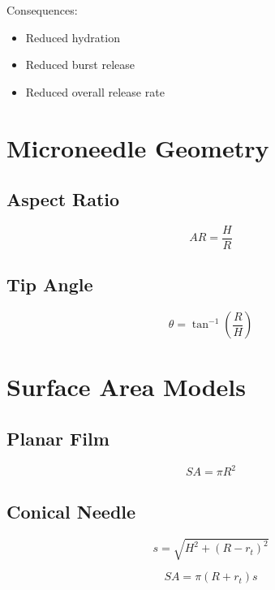 \documentclass[11pt]{article}
\begin{document}
Consequences:

\begin{itemize}
\item Reduced hydration
\item Reduced burst release
\item Reduced overall release rate
\end{itemize}

\section{Microneedle Geometry}

\subsection{Aspect Ratio}

\begin{equation}
AR=\frac{H}{R}
\end{equation}

\subsection{Tip Angle}

\begin{equation}
\theta=\tan^{-1}\left(\frac{R}{H}\right)
\end{equation}

\section{Surface Area Models}

\subsection{Planar Film}

\begin{equation}
SA=\pi R^2
\end{equation}

\subsection{Conical Needle}

\begin{equation}
s=\sqrt{H^2+(R-r_t)^2}
\end{equation}

\begin{equation}
SA=\pi(R+r_t)s
\end{equation}
\end{document}
